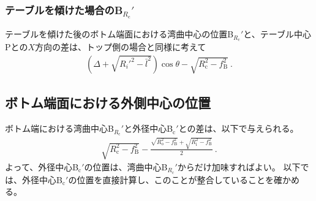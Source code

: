 \subsubsection{テーブルを傾けた場合のB\texorpdfstring{$_{R_\mathrm c}'$}{Rc'}}
テーブルを傾けた後のボトム端面における湾曲中心の位置B$_{R_\mathrm c}'$と、テーブル中心Pとの$X$方向の差は、トップ側の場合と同様に考えて
\begin{align}
  \label{eq:tableBRc}
  \left(\varDelta+\sqrt{R_i'^2-\bar l^2}\right)\!\cos\theta-\sqrt{R_\mathrm c^2-f_\mathrm B^2}~.
\end{align}



\subsection{ボトム端面における外側中心の位置}
ボトム端における湾曲中心B$_{R_\mathrm c}'$と外径中心B$_\mathrm c'$との差は、以下で与えられる。
\begin{align}
  \label{eq:BRc-Bc}
  \sqrt{R_\mathrm c^2-f_\mathrm B^2}
  -\frac{\sqrt{R_\mathrm o^2-f_\mathrm B^2}+\sqrt{R_\mathrm i^2-f_\mathrm B^2}}2\ .
\end{align}
よって、外径中心B$_\mathrm c'$の位置は、湾曲中心B$_{R_\mathrm c}'$からだけ加味すればよい。
以下では、外径中心B$_\mathrm c'$の位置を直接計算し、このことが整合していることを確かめる。


